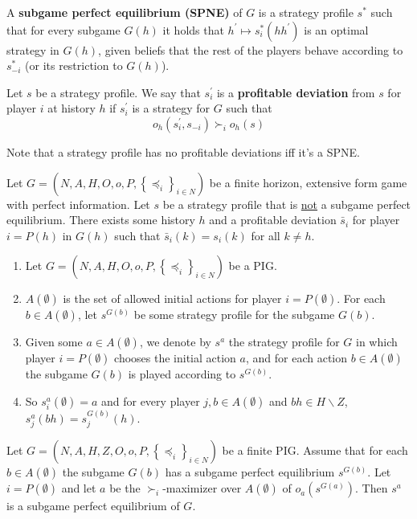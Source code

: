 \documentclass[11pt]{elegantbook_2}
\begin{document}
\begin{definition}
    A \textbf{subgame perfect equilibrium (SPNE)} of $G$ is a strategy profile $s^*$ such that for every subgame $G(h)$ it holds that $h^{\prime} \mapsto s_i^*\left(h h^{\prime}\right)$ is an optimal strategy in $G(h)$, given beliefs that the rest of the players behave according to $s_{-i}^*$ (or its restriction to $G(h)$).
\end{definition}

\begin{definition}
    Let $s$ be a strategy profile. We say that $s_i^{\prime}$ is a \textbf{profitable deviation} from $s$ for player $i$ at history $h$ if $s_i^{\prime}$ is a strategy for $G$ such that
    $$
    o_h\left(s_i^{\prime}, s_{-i}\right) \succ_i o_h(s)
    $$
\end{definition}
Note that a strategy profile has no profitable deviations iff it's a SPNE.

\begin{theorem}
    Let $G=\left(N, A, H, O, o, P,\left\{\preceq_i\right\}_{i \in N}\right)$ be a finite horizon, extensive form game with perfect information. Let $s$ be a strategy profile that is \underline{not} a subgame perfect equilibrium. There exists some history $h$ and a profitable deviation $\bar{s}_i$ for player $i=P(h)$ in $G(h)$ such that $\bar{s}_i(k)=s_i(k)$ for all $k \neq h$.
\end{theorem}
\begin{enumerate}[$\circ$]
    \item Let $G=\left(N, A, H, O, o, P,\left\{\preceq_i\right\}_{i \in N}\right)$ be a PIG.
    \item $A(\emptyset)$ is the set of allowed initial actions for player $i=P(\emptyset)$. For each $b \in A(\emptyset)$, let $s^{G(b)}$ be some strategy profile for the subgame $G(b)$.
    \item Given some $a \in A(\emptyset)$, we denote by $s^a$ the strategy profile for $G$ in which player $i=P(\emptyset)$ chooses the initial action $a$, and for each action $b \in A(\emptyset)$ the subgame $G(b)$ is played according to $s^{G(b)}$.
    \item So $s_i^a(\emptyset)=a$ and for every player $j, b \in A(\emptyset)$ and $b h \in H \backslash Z$, $s_j^a(b h)=s_j^{G(b)}(h)$.
\end{enumerate}
\begin{lemma}
    Let $G=\left(N, A, H, Z, O, o, P,\left\{\preceq_i\right\}_{i \in N}\right)$ be a finite PIG. Assume that for each $b \in A(\emptyset)$ the subgame $G(b)$ has a subgame perfect equilibrium $s^{G(b)}$. Let $i=P(\emptyset)$ and let $a$ be the $\succ_i$-maximizer over $A(\emptyset)$ of $o_a\left(s^{G(a)}\right)$. Then $s^a$ is a subgame perfect equilibrium of $G$.
\end{lemma}
\end{document}
